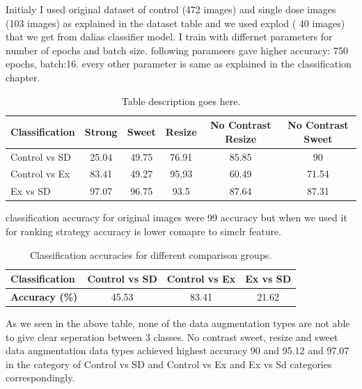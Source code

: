 Initialy I used original dataset of control (472 images) and single dose images (103 images) as explained in the dataset table and we used explod ( 40 images) that we get from dalias classifier model.
I train with differnet parameters for  number of epochs and batch size. following parameers gave higher accuracy: 750 epochs, batch:16. every other parameter is same as explained in the classification chapter.


\begin{table}[H]
  \centering
  \begin{tabular}{@{}lccccc@{}}
  \toprule
  \textbf{Classification} & \textbf{Strong} & \textbf{Sweet} & \textbf{Resize} & \textbf{No Contrast Resize} & \textbf{No Contrast Sweet} \\ \midrule
  Control vs SD             & 25.04            & 49.75           & 76.91          & 85.85                         & 90                        \\
  Control vs Ex             & 83.41            & 49.27               & 95.93           & 60.49                          &    71.54                 \\
  Ex vs SD                & 97.07           & 96.75          & 93.5           & 87.64                       & 87.31                        \\ \bottomrule
  \end{tabular}
  \caption{Table description goes here.}
  \label{tab:ranking softmax}
\end{table}
classification accuracy for original images were 99 accuracy but when we used it for ranking strategy accuracy is lower comapre to simclr feature.
\begin{table}[H]
  \centering
  \begin{tabular}{@{}lccc@{}}
  \toprule
  \textbf{Classification}     & \textbf{Control vs SD} & \textbf{Control vs Ex} & \textbf{Ex vs SD} \\ \midrule
  \textbf{Accuracy (\%)}      & 45.53                  & 83.41                  & 21.62             \\ \bottomrule
  \end{tabular}
  \caption{Classification accuracies for different comparison groups.}
  \label{tab:classification_accuracies}
  \end{table}
  
As we seen in the above table, none of the  data augmentation types are not able to give clear seperation between 3 classes. No contrast sweet, resize and sweet data augmentation data types achieved highest accuracy 90 and 95.12 and 97.07  in the category of  Control vs SD and Control vs Ex and Ex vs Sd categories correspondingly. 

